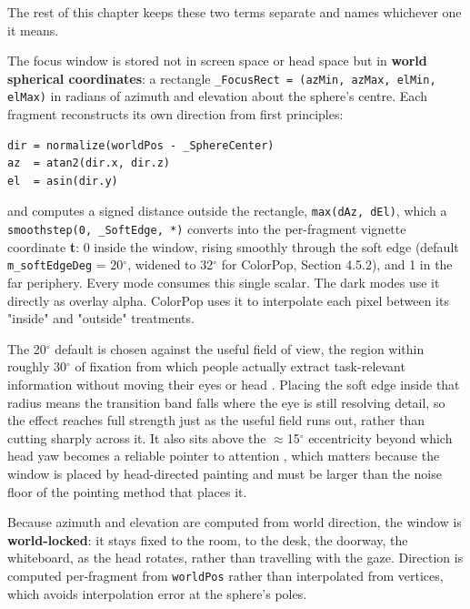 The rest of this chapter keeps these two terms separate and names whichever one it means.

The focus window is stored not in screen space or head space but in \textbf{world spherical
coordinates}: a rectangle
\verb|_FocusRect = (azMin, azMax, elMin, elMax)| in radians of azimuth and elevation about the sphere's
centre. Each fragment reconstructs its own direction from first principles:

\begin{verbatim}
dir = normalize(worldPos - _SphereCenter)
az  = atan2(dir.x, dir.z)
el  = asin(dir.y)
\end{verbatim}

and computes a signed distance outside the rectangle, \verb|max(dAz, dEl)|, which a
\verb|smoothstep(0, _SoftEdge, *)| converts into the per-fragment vignette coordinate \textbf{t}: 0 inside
the window, rising smoothly through the soft edge (default \verb|m_softEdgeDeg| = 20$^{\circ}$, widened to 32$^{\circ}$
for ColorPop, Section 4.5.2), and 1 in the far periphery. Every mode consumes this single scalar.
The dark modes use it directly as overlay alpha. ColorPop uses it to interpolate each pixel between
its "inside" and "outside" treatments.

The 20$^{\circ}$ default is chosen against the useful field of view, the region within roughly
30$^{\circ}$ of fixation from which people actually extract task-relevant information without moving
their eyes or head \citep{ball1993}. Placing the soft edge inside that radius means the
transition band falls where the eye is still resolving detail, so the effect reaches full strength
just as the useful field runs out, rather than cutting sharply across it. It also sits above the
$\approx$15$^{\circ}$ eccentricity beyond which head yaw becomes a reliable pointer to attention \citep{higgins2022}, which matters because the window is placed by head-directed painting and must be
larger than the noise floor of the pointing method that places it.

Because azimuth and elevation are computed from world direction, the window is \textbf{world-locked}: it
stays fixed to the room, to the desk, the doorway, the whiteboard, as the head rotates, rather
than travelling with the gaze. Direction is computed per-fragment from \verb|worldPos| rather than
interpolated from vertices, which avoids interpolation error at the sphere's poles.


